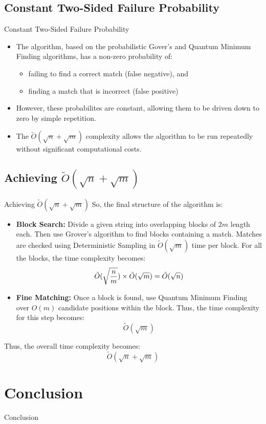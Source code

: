\documentclass{beamer}
\begin{document}
\subsection{Constant Two-Sided Failure Probability}
\begin{frame}{Constant Two-Sided Failure Probability}
	\begin{itemize}
		\item The algorithm, based on the probabilistic Gover's and Quantum Minimum Finding algorithms, has a non-zero probability of:
		\begin{itemize}
			\item failing to find a correct match (false negative), and
			\item finding a match that is incorrect (false positive)
		\end{itemize}

		\item However, these probabilites are constant, allowing them to be driven down to zero by simple repetition.
		\item The $\tilde{O} (\sqrt{n} + \sqrt{m})$ complexity allows the algorithm to be run repeatedly without significant computational costs.
	\end{itemize}
\end{frame}

\subsection{Achieving \texorpdfstring{$\tilde{O}(\sqrt{n} + \sqrt{m})$}{O(sqrt(n)+sqrt(m))}}
\begin{frame}{Achieving \texorpdfstring{$\tilde{O}(\sqrt{n} + \sqrt{m})$}{O(sqrt(n)+sqrt(m))}}
	So, the final structure of the algorithm is:
	\begin{itemize}
		\item \textbf{Block Search: }Divide a given string into overlapping blocks of $2m$ length each. Then use Grover's algorithm to find blocks containing a match. Matches are checked using Deterministic Sampling in $\tilde{O}(\sqrt{m})$ time per block. For all the blocks, the time complexity becomes:
		\[
			\tilde{O} ( \sqrt{n \over m} ) \times \tilde{O}(\sqrt{m}) = \tilde{O}(\sqrt{n})
		\]
		\item \textbf{Fine Matching: }Once a block is found, use Quantum Minimum Finding over $O(m)$ candidate positions within the block. Thus, the time complexity for this step becomes:
		\[
		\tilde{O}(\sqrt{m})
		\]
	\end{itemize}
	Thus, the overall time complexity becomes:
	\[
	\tilde{O}(\sqrt{n}+\sqrt{m})
	\]
	
\end{frame}


\section{Conclusion}
\begin{frame}{Conclusion}
\end{frame}
\end{document}
